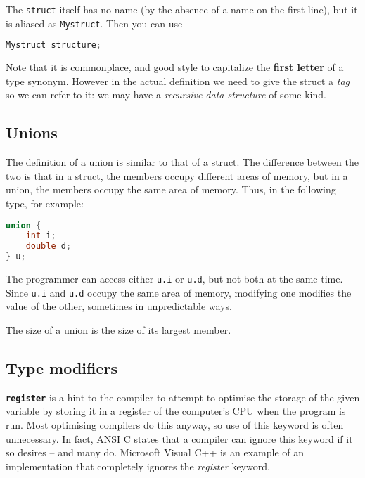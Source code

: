 The \texttt{struct} itself has no name (by the absence of a name on the first
line), but it is aliased as \texttt{Mystruct}. Then you can use
\lstset{basicstyle=\scriptsize, numbers=left, captionpos=b, tabsize=4}
\begin{lstlisting}[caption=Section \thesection listing \arabic{comtypcnt},language={C},
breaklines=true,xleftmargin=15pt,label=lst:section\thesection listing\arabic{comtypcnt}]
Mystruct structure;
\end{lstlisting}

Note that it is commonplace, and good style to capitalize the \textbf{first
letter} of a type synonym. However in the actual definition we need to give the
struct a \emph{tag} so we can refer to it: we may have a \emph{recursive data
structure} of some kind.

\subsection{Unions}
The definition of a union is similar to that of a struct. The difference
between the two is that in a struct, the members occupy different areas of
memory, but in a union, the members occupy the same area of memory. Thus, in
the following type, for example:
\lstset{basicstyle=\scriptsize, numbers=left, captionpos=b, tabsize=4}
\begin{lstlisting}[caption=Section \thesection listing \arabic{comtypcnt},language={C},
breaklines=true,xleftmargin=15pt,label=lst:section\thesection listing\arabic{comtypcnt}]
union {
    int i;
    double d;
} u;
\end{lstlisting}

The programmer can access either \texttt{u.i} or \texttt{u.d}, but not both at
the same time. Since \texttt{u.i} and \texttt{u.d} occupy the same area of
memory, modifying one modifies the value of the other, sometimes in
unpredictable ways.

The size of a union is the size of its largest member.

\subsection{Type modifiers}
\textbf{\texttt{register}} is a hint to the compiler to attempt to optimise the
storage of the given variable by storing it in a register of the computer's CPU
when the program is run. Most optimising compilers do this anyway, so use of
this keyword is often unnecessary. In fact, ANSI C states that a compiler can
ignore this keyword if it so desires -- and many do. Microsoft Visual C++ is an
example of an implementation that completely ignores the \emph{register}
keyword.

